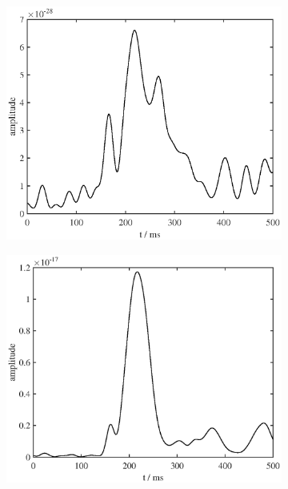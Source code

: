 \documentclass[doc,a4paper,12pt]{apa6}
\begin{document}
\begin{figure}
\begin{subfigure}[c]{0.47\textwidth}
    \label{img:pa07:zeit:raw-mne}
  \end{subfigure}\vspace*{0.04\textwidth}
  \begin{subfigure}[c]{0.47\textwidth}
    \includegraphics[width=\textwidth]{ergebnisse/pa07/pa07_eve2_sss_lcmv_timecourse.eps}
    \label{img:pa07:zeit:sss-lcmv}
  \end{subfigure}\hspace*{0.04\textwidth}
  \begin{subfigure}[c]{0.47\textwidth}
    \includegraphics[width=\textwidth]{ergebnisse/pa07/pa07_eve2_sss_mne_timecourse.eps}

\end{subfigure}
\end{figure}
\end{document}
